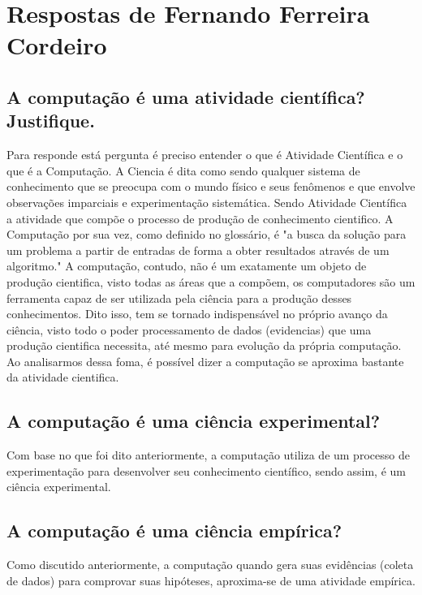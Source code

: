 \section{Respostas de Fernando Ferreira Cordeiro}


\subsection{A computação é uma atividade científica? Justifique.
}
Para responde está pergunta é preciso entender o que é Atividade Científica e o que é a Computação.
A \gls{Ciencia} é dita como sendo qualquer sistema de conhecimento que se preocupa com o mundo físico e seus fenômenos e que envolve 
observações imparciais e experimentação sistemática. Sendo Atividade Científica a atividade que compõe o processo de produção de conhecimento cientifico.
A \gls{Computação} por sua vez, como definido no glossário, é "a busca da solução para um problema a partir de entradas de forma a
obter resultados através de um algoritmo." A computação, contudo, não é um exatamente um objeto de produção cientifica, visto todas as áreas que a compõem, os computadores são um ferramenta capaz de ser utilizada pela ciência para a produção desses conhecimentos.
Dito isso, tem se tornado indispensável no próprio avanço da ciência, visto todo o poder processamento de dados (evidencias) que uma produção cientifica necessita, até mesmo para evolução da própria computação.
Ao analisarmos dessa foma, é possível dizer a computação se aproxima bastante da atividade cientifica.

\subsection{A computação é uma ciência experimental?}

Com base no que foi dito anteriormente, a computação utiliza de um processo de experimentação para desenvolver seu conhecimento científico, sendo assim, é um ciência experimental.

\subsection{A computação é uma ciência empírica?}

Como discutido anteriormente, a computação quando gera suas evidências (coleta de dados) para comprovar suas hipóteses, aproxima-se de uma atividade empírica.